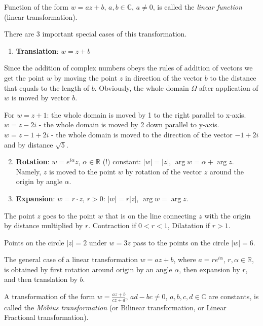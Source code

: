 \documentclass[12pt]{article}
\begin{document}
\begin{definition}
Function of the form $w = az + b$, $a, b \in \mathbb{C}$, $a \neq 0$, is called the \emph{linear function} (linear transformation).
\end{definition}

There are 3 important special cases of this transformation.
\begin{enumerate}
    \item \textbf{Translation}: $w = z + b$
\end{enumerate}
Since the addition of complex numbers obeys the rules of addition of vectors we get the point $w$ by moving the point $z$ in direction of the vector $b$ to the distance that equals to the length of $b$. Obviously, the whole domain $\Omega$ after application of $w$ is moved by vector $b$.

\begin{example}
For $w = z+1$: the whole domain is moved by 1 to the right parallel to x-axis.
$w = z-2i$ - the whole domain is moved by 2 down parallel to y-axis.
$w = z-1+2i$ - the whole domain is moved to the direction of the vector $-1+2i$ and by distance $\sqrt{5}$.
\end{example}

\begin{enumerate}
    \setcounter{enumi}{1}
    \item \textbf{Rotation}: $w = e^{i\alpha}z$, $\alpha \in \mathbb{R}$ (!) constant: $|w| = |z|$, $\arg w = \alpha + \arg z$. Namely, $z$ is moved to the point $w$ by rotation of the vector $z$ around the origin by angle $\alpha$.
    \item \textbf{Expansion}: $w = r \cdot z$, $r > 0$: $|w| = r|z|$, $\arg w = \arg z$.
\end{enumerate}
The point $z$ goes to the point $w$ that is on the line connecting $z$ with the origin by distance multiplied by $r$.
Contraction if $0 < r < 1$, Dilatation if $r > 1$.

\begin{example}
Points on the circle $|z| = 2$ under $w = 3z$ pass to the points on the circle $|w| = 6$.
\end{example}

The general case of a linear transformation $w = az + b$, where $a = re^{i\alpha}$, $r, \alpha \in \mathbb{R}$, is obtained by first rotation around origin by an angle $\alpha$, then expansion by $r$, and then translation by $b$.

\begin{definition}
A transformation of the form $w = \frac{az+b}{cz+d}$, $ad-bc \neq 0$, $a,b,c,d \in \mathbb{C}$ are constants, is called the \emph{Möbius transformation} (or Bilinear transformation, or Linear Fractional transformation).
\end{definition}
\end{document}
